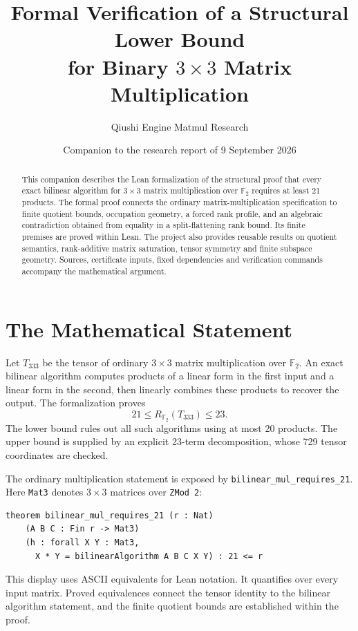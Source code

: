 \documentclass[11pt]{article}
\title{Formal Verification of a Structural Lower Bound\protect\\
  for Binary $3\times3$ Matrix Multiplication}
\author{Qiushi Engine Matmul Research}
\date{Companion to the research report of 9 September 2026}
\begin{document}
\maketitle
\begin{abstract}
This companion describes the Lean formalization of the structural proof that
every exact bilinear algorithm for $3\times3$ matrix multiplication over
$\mathbb F_2$ requires at least 21 products. The formal proof connects the
ordinary matrix-multiplication specification to finite quotient bounds,
occupation geometry, a forced rank profile, and an algebraic contradiction
obtained from equality in a split-flattening rank bound. Its finite premises
are proved within Lean. The
project also provides reusable results on quotient semantics, rank-additive
matrix saturation, tensor symmetry and finite subspace geometry. Sources,
certificate inputs, fixed dependencies and verification commands accompany
the mathematical argument.
\end{abstract}

\section{The Mathematical Statement}
Let $T_{333}$ be the tensor of ordinary $3\times3$ matrix multiplication over
$\mathbb F_2$. An exact bilinear algorithm computes products of a linear form
in the first input and a linear form in the second, then linearly combines
these products to recover the output. The formalization proves
\begin{equation}
  21\le R_{\mathbb F_2}(T_{333})\le23.
\end{equation}
The lower bound rules out all such algorithms using at most 20 products.
The upper bound is supplied by an
explicit 23-term decomposition, whose 729 tensor coordinates are checked.

The ordinary multiplication statement is exposed by
\texttt{bilinear\_mul\_requires\_21}. Here \texttt{Mat3} denotes
$3\times3$ matrices over \texttt{ZMod 2}:
\begin{lstlisting}
theorem bilinear_mul_requires_21 (r : Nat)
    (A B C : Fin r -> Mat3)
    (h : forall X Y : Mat3,
      X * Y = bilinearAlgorithm A B C X Y) : 21 <= r
\end{lstlisting}
This display uses ASCII equivalents for Lean notation. It quantifies over
every input matrix. Proved equivalences connect the tensor identity to the
bilinear algorithm statement, and the finite quotient bounds are established
within the proof.
\end{document}
